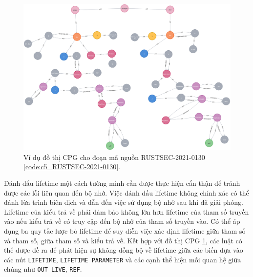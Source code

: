 \begin{figure}[H]
    \includegraphics[width=1\columnwidth]{figures/c5/c5_RUSTSEC-2021-0130.png}
    \centering
    \caption{Ví dụ đồ thị CPG cho đoạn mã nguồn RUSTSEC-2021-0130 \ref{code:c5_RUSTSEC-2021-0130}.}
    \label{img:c5_RUSTSEC-2021-0130}
\end{figure}

Đánh dấu lifetime một cách tường minh cần được thực hiện cẩn thận để tránh được các lỗi liên quan đến bộ nhớ.
Việc đánh dấu lifetime không chính xác có thể đánh lừa trình biên dịch và dẫn đến việc sử dụng bộ nhớ sau khi đã giải phóng.
Lifetime của kiểu trả về phải đảm bảo không lớn hơn lifetime của tham số truyền vào nếu kiểu trả về có truy cập đến bộ nhớ của tham số truyền vào.
Có thể áp dụng ba quy tắc lược bỏ lifetime để suy diễn việc xác định lifetime giữa tham số và tham số, giữa tham số và kiểu trả về.
Kết hợp với đồ thị CPG \ref{img:c5_RUSTSEC-2021-0130}, các luật có thể được đề ra để phát hiện sự không đồng bộ về lifetime giữa các biến dựa vào các nút \texttt{LIFETIME},
\texttt{LIFETIME PARAMETER} và các cạnh thể hiện mối quan hệ giữa chúng như \texttt{OUT LIVE}, \texttt{REF}.
